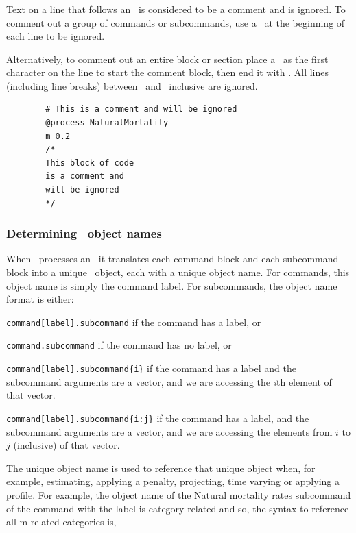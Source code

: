 \subsubsection{}
Text on a line that follows an \commentline\ is considered to be a comment and is ignored. To comment out a group of commands or subcommands, use a \commentline\ at the beginning of each line to be ignored.

Alternatively, to comment out an entire block or section place a \commentstart\ as the first character on the line to start the comment block, then end it with \commentend. All lines (including line breaks) between \commentstart\ and \commentend\ inclusive are ignored. 
{\small{\begin{verbatim}
		# This is a comment and will be ignored
		@process NaturalMortality
		m 0.2
		/* 
		This block of code 
		is a comment and
		will be ignored
		*/
		\end{verbatim}}}

\subsubsection{Determining \CNAME\ object names\label{sec:object-names}}

When \CNAME\ processes an \config\ it translates each command block and each subcommand block into a unique \CNAME\ object, each with a unique object name. For commands, this object name is simply the command label. For subcommands, the object name format is either: 

\begin{description}
\item \texttt{command[label].subcommand} if the command has a label, or
\item \texttt{command.subcommand} if the command has no label, or
\item \texttt{command[label].subcommand\{i\}} if the command has a label and the subcommand arguments are a vector, and we are accessing the  \emph{i}th element of that vector. 
\item \texttt{command[label].subcommand\{i:j\}} if the command has a label, and the subcommand arguments are a vector, and we are accessing the elements from $i$ to $j$ (inclusive) of that vector.
\end{description} 

The unique object name is used to reference that unique object when, for example, estimating, applying a penalty, projecting, time varying or applying a profile. For example, the object name of the Natural mortality rates subcommand  of the command  with the label  is category related and so, the syntax to reference all m related categories is, 

